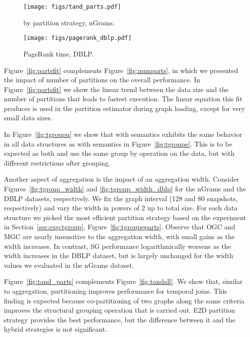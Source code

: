 \begin{figure*}[t!]
\centering
\begin{minipage}{3in}
  \centering
  \texttt{[image: figs/tand\_parts.pdf]}
\vspace{-0.1in}
  \caption{ by partition strategy, nGrams.}
  \label{fig:tand_parts}
\vspace{-0.1in}
\end{minipage}
\begin{minipage}{3in}
  \centering
  \texttt{[image: figs/pagerank\_dblp.pdf]}
\vspace{-0.1in}
  \caption{PageRank time, DBLP.}
  \label{fig:pagerank_dblp}
\vspace{-0.1in}
\end{minipage}
\end{figure*}

Figure~\ref{fig:partsfit} complements Figure~\ref{fig:numparts}, in
which we presented the impact of number of partitions on the overall
performance.  In Figure~\ref{fig:partsfit} we show the linear trend
between the data size and the number of partitions that leads to
fastest execution.  The linear equation this fit produces is used in
the partition estimator during graph loading, except for very small
data sizes.

In Figure~\ref{fig:tgroupu} we show that  with
 semantics exhibits the same behavior in all data
structures as  with  semantics in
Figure~\ref{fig:tgroupe}.  This is to be expected as both 
and  use the same group by operation on the data, but with
different restrictions after grouping.

Another aspect of aggregation is the impact of an aggregation width.
Consider Figures~\ref{fig:tgroup_width} and
\ref{fig:tgroup_width_dblp} for the nGrams and the DBLP datasets,
respectively.  We fix the graph interval (128 and 80 snapshots,
respectively) and vary the width in powers of 2 up to total size.  For
each data structure we picked the most efficient partition strategy
based on the experiment in Section~\ref{sec:exp:tgroup},
Figure~\ref{fig:tgroupeparts}.  Observe that OGC and MGC are nearly
insensitive to the aggregation width, with small gains as the width
increases.  In contrast, SG performance logarithmically worsens as the
width increases in the DBLP dataset, but is largely unchanged for the
width values we evaluated in the nGrams dataset.

Figure~\ref{fig:tand_parts} complements Figure~\ref{fig:tandall}.  We
show that, similar to aggregation, partitioning improves performance
for temporal joins.  This finding is expected because co-partitioning
of two graphs along the same criteria improves the structural grouping
operation that is carried out. E2D partition strategy provides the
best performance, but the difference between it and the hybrid
strategies is not significant.

